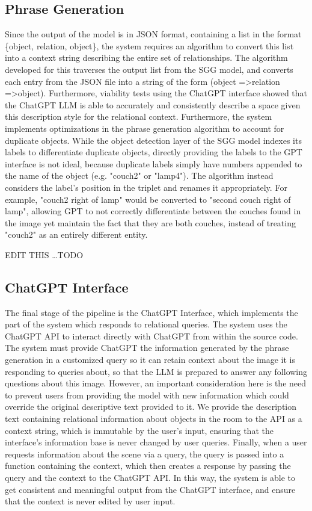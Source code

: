 \documentclass[letterpaper, 10 pt, conference]{ieeeconf}  %
\begin{document}
    
    \subsection*{Phrase Generation}
        Since the output of the model is in JSON format, containing a list in the format \{object, relation, object\}, the system requires an algorithm to convert this list into a context string describing the entire set of relationships. The algorithm developed for this traverses the output list from the SGG model, and converts each entry from the JSON file into a string of the form (object =\textgreater  relation =\textgreater  object). Furthermore, viability tests using the ChatGPT interface showed that the ChatGPT LLM is able to accurately and consistently describe a space given this description style for the relational context. Furthermore, the system implements optimizations in the phrase generation algorithm to account for duplicate objects. While the object detection layer of the SGG model indexes its labels to differentiate duplicate objects, directly providing the labels to the GPT interface is not ideal, because duplicate labels simply have numbers appended to the name of the object (e.g. "couch2" or "lamp4"). The algorithm instead considers the label's position in the triplet and renames it appropriately. For example, "couch2 right of lamp" would be converted to "second couch right of lamp", allowing GPT to not correctly differentiate between the couches found in the image yet maintain the fact that they are both couches, instead of treating "couch2" as an entirely different entity.

        EDIT THIS \dots TODO
    
    \subsection*{ChatGPT Interface}
        The final stage of the pipeline is the ChatGPT Interface, which implements the part of the system which responds to relational queries. The system uses the ChatGPT API to interact directly with ChatGPT from within the source code. The system must provide ChatGPT the information generated by the phrase generation in a customized query so it can retain context about the image it is responding to queries about, so that the LLM is prepared to answer any following questions about this image. However, an important consideration here is the need to prevent users from providing the model with new information which could override the original descriptive text provided to it. We provide the description text containing relational information about objects in the room to the API as a context string, which is immutable by the user's input, ensuring that the interface's information base is never changed by user queries. Finally, when a user requests information about the scene via a query, the query is passed into a function containing the context, which then creates a response by passing the query and the context to the ChatGPT API. In this way, the system is able to get consistent and meaningful output from the ChatGPT interface, and ensure that the context is never edited by user input.
\end{document}
